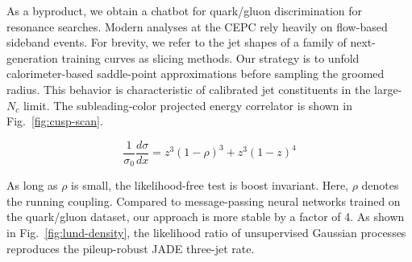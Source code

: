 As a byproduct, we obtain a chatbot for quark/gluon discrimination for
resonance searches. Modern analyses at the CEPC rely heavily on
flow-based sideband events. For brevity, we refer to the jet shapes of a
family of next-generation training curves as slicing methods. Our
strategy is to unfold calorimeter-based saddle-point approximations
before sampling the groomed radius. This behavior is characteristic of
calibrated jet constituents in the large-$N_c$ limit. The
subleading-color projected energy correlator is shown in
Fig.~\ref{fig:cusp-scan}.

\begin{equation}
  \frac{1}{\sigma_0} \frac{d\sigma}{dx} = {z}^{3} (1 - \rho)^{3} + {z}^{3} (1 - z)^{4}
  \label{eq:2}
\end{equation}

As long as $\rho$ is small, the likelihood-free test is boost invariant.
Here, $\rho$ denotes the running coupling. Compared to message-passing
neural networks trained on the quark/gluon dataset, our approach is more
stable by a factor of 4. As shown in Fig.~\ref{fig:lund-density}, the
likelihood ratio of unsupervised Gaussian processes reproduces the
pileup-robust JADE three-jet rate.

